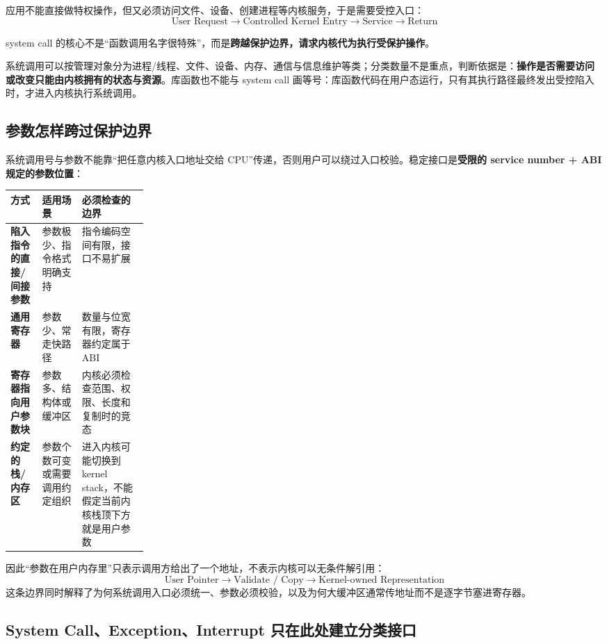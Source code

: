 \documentclass[11pt,a4paper]{ctexart}
\newcommand{\kw}[1]{\textbf{#1}}
\begin{document}
应用不能直接做特权操作，但又必须访问文件、设备、创建进程等内核服务，于是需要受控入口：
\[
\boxed{\text{User Request}\rightarrow\text{Controlled Kernel Entry}\rightarrow\text{Service}\rightarrow\text{Return}}
\]

system call 的核心不是“函数调用名字很特殊”，而是\kw{跨越保护边界，请求内核代为执行受保护操作}。

系统调用可以按管理对象分为进程/线程、文件、设备、内存、通信与信息维护等类；分类数量不是重点，判断依据是：\kw{操作是否需要访问或改变只能由内核拥有的状态与资源}。库函数也不能与 system call 画等号：库函数代码在用户态运行，只有其执行路径最终发出受控陷入时，才进入内核执行系统调用。

\subsection{参数怎样跨过保护边界}

系统调用号与参数不能靠“把任意内核入口地址交给 CPU”传递，否则用户可以绕过入口校验。稳定接口是\kw{受限的 service number + ABI 规定的参数位置}：

\begin{center}
\small
\renewcommand{\arraystretch}{1.25}
\begin{tabularx}{\linewidth}{>{\bfseries}p{0.23\linewidth} X X}
\toprule
方式 & 适用场景 & 必须检查的边界\\
\midrule
陷入指令的直接/间接参数 & 参数极少、指令格式明确支持 & 指令编码空间有限，接口不易扩展\\
通用寄存器 & 参数少、常走快路径 & 数量与位宽有限，寄存器约定属于 ABI\\
寄存器指向用户参数块 & 参数多、结构体或缓冲区 & 内核必须检查范围、权限、长度和复制时的竞态\\
约定的栈/内存区 & 参数个数可变或需要调用约定组织 & 进入内核可能切换到 kernel stack，不能假定当前内核栈顶下方就是用户参数\\
\bottomrule
\end{tabularx}
\end{center}

因此“参数在用户内存里”只表示调用方给出了一个地址，不表示内核可以无条件解引用：
\[
\boxed{\text{User Pointer}\to\text{Validate / Copy}\to\text{Kernel-owned Representation}}
\]
这条边界同时解释了为何系统调用入口必须统一、参数必须校验，以及为何大缓冲区通常传地址而不是逐字节塞进寄存器。

\subsection{System Call、Exception、Interrupt 只在此处建立分类接口}
\end{document}
